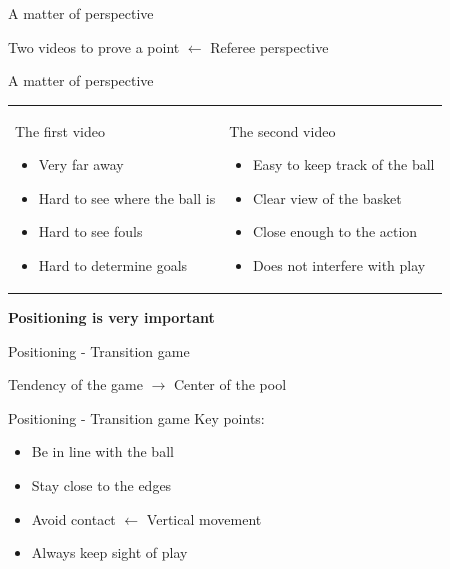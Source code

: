\documentclass{beamer}
\begin{document}
    \begin{frame}{A matter of perspective}
        \begin{center}
            Two videos to prove a point $\leftarrow$ Referee perspective
        \end{center}
    \end{frame}

    \begin{frame}{A matter of perspective}
        \begin{tabular}{ll}
            \parbox{0.5\linewidth}{
                The first video
                \begin{itemize}
                    \item Very far away
                    \item Hard to see where the ball is
                    \item Hard to see fouls
                    \item Hard to determine goals
                \end{itemize}
                \pause
            }
            &
            \parbox{0.5\linewidth}{
                The second video
                \begin{itemize}
                    \item Easy to keep track of the ball
                    \item Clear view of the basket
                    \item Close enough to the action
                    \item Does not interfere with play
                \end{itemize}
            }
        \end{tabular}
        \pause
        \begin{center}
            \textbf{Positioning is very important}
        \end{center}
    \end{frame}

    \begin{frame}{Positioning - Transition game}
        \begin{center}
            Tendency of the game $\rightarrow$ Center of the pool
        \end{center}
    \end{frame}

    \begin{frame}{Positioning - Transition game}
        Key points:
        \begin{itemize}
            \item Be in line with the ball
            \item Stay close to the edges
            \item Avoid contact $\leftarrow$ Vertical movement
            \item Always keep sight of play
        \end{itemize}
    \end{frame}
\end{document}
